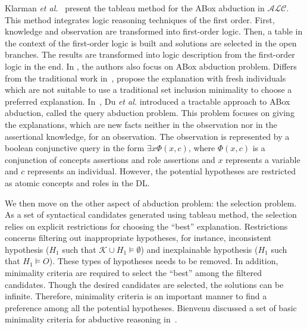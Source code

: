 \documentclass{article}
\begin{document}
Klarman \textit{et al.}~\cite{klarman2011abox} present the tableau method for the ABox abduction in $\mathcal{ALC}$.
This method integrates logic reasoning techniques of the first order. First, knowledge and observation are
transformed into first-order logic. Then, a table in the context of the first-order logic is built and solutions
are selected in the open branches. The results are transformed into logic description from the first-order logic in the end.
In \cite{du2011towards,du2014tractable}, the authors also focus on ABox abduction problem. 
Differs from the traditional work in~\cite{klarman2011abox}, \cite{du2014tractable} propose the explanation 
with fresh individuals which are not suitable to use a traditional set inclusion minimality to choose a preferred explanation.
In~\cite{du2014tractable}, Du \textit{et al.} introduced a tractable approach to ABox abduction, called the query abduction problem.
This problem focuses on giving the explanations, which are new facts neither in the observation nor in the assertional knowledge, for an observation.
The observation is represented by a boolean conjunctive query in the form $\exists x\Phi(x,c)$, where $\Phi(x,c)$ is a conjunction of concepts
assertions and role assertions and $x$ represents a variable and $c$ represents an individual.
However, the potential hypotheses are restricted as  atomic concepts and roles in the DL.



We then move on the other aspect of abduction problem: the selection problem.
As a set of syntactical candidates generated using tableau method, the selection relies on explicit restrictions for choosing the ``best'' explanation.
Restrictions concerns filtering out inappropriate hypotheses,
for instance, inconsistent hypothesis ($H_1$ such that $\mathcal{K}\cup H_1\vDash \emptyset$) and inexplainable hypothesis ($H_1$ such that $H_1\vDash O$).
These types of hypotheses needs to be removed.
In addition, minimality criteria are required to select the ``best'' among the filtered candidates.
Though the desired candidates are selected, the solutions can be infinite.
Therefore, minimality criteria is an important manner to find a preference among all the potential hypotheses.
Bienvenu  discussed a set of basic minimality criteria for abductive reasoning in~\cite{bienvenu08complexity}.
\end{document}
